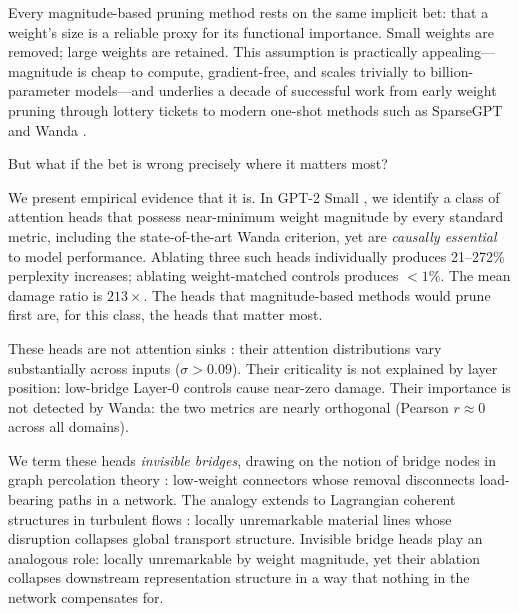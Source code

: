 \documentclass[11pt,a4paper]{article}
\theoremstyle{definition}
\theoremstyle{plain}
\begin{document}
Every magnitude-based pruning method rests on the same implicit bet:
that a weight's size is a reliable proxy for its functional importance.
Small weights are removed; large weights are retained.
This assumption is practically appealing---magnitude is cheap to compute,
gradient-free, and scales trivially to billion-parameter models---and
underlies a decade of successful work from early weight pruning
\citep{han2015learning} through lottery tickets \citep{frankle2019lottery}
to modern one-shot methods such as SparseGPT \citep{frantar2023sparsegpt}
and Wanda \citep{sun2024wanda}.

But what if the bet is wrong precisely where it matters most?

We present empirical evidence that it is.
In GPT-2 Small \citep{radford2019gpt2}, we identify a class of attention
heads that possess near-minimum weight magnitude by every standard metric,
including the state-of-the-art Wanda criterion, yet are \emph{causally
essential} to model performance.
Ablating three such heads individually produces 21--272\% perplexity
increases; ablating weight-matched controls produces $<1\%$.
The mean damage ratio is $213\times$.
The heads that magnitude-based methods would prune first are, for this
class, the heads that matter most.

These heads are not attention sinks \citep{xiao2024sinks}: their
attention distributions vary substantially across inputs
($\sigma > 0.09$).
Their criticality is not explained by layer position: low-bridge Layer-0
controls cause near-zero damage.
Their importance is not detected by Wanda: the two metrics are nearly
orthogonal (Pearson $r \approx 0$ across all domains).

We term these heads \emph{invisible bridges}, drawing on the notion of
bridge nodes in graph percolation theory
\citep{broadbent1957percolation,freeman1977betweenness}: low-weight
connectors whose removal disconnects load-bearing paths in a network.
The analogy extends to Lagrangian coherent structures in turbulent flows
\citep{haller2000lagrangian}: locally unremarkable material lines whose
disruption collapses global transport structure.
Invisible bridge heads play an analogous role: locally unremarkable
by weight magnitude, yet their ablation collapses downstream
representation structure in a way that nothing in the network
compensates for.
\end{document}
